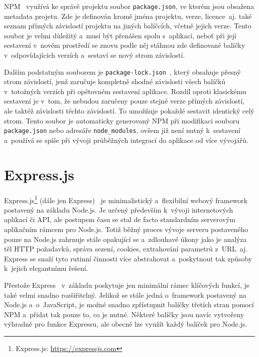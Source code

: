 NPM~\cite{thesis:WebApp} využívá ke správě projektu soubor \texttt{package.json}, ve kterém jsou obsažena metadata projetu. Zde je definován kromě jména projektu, verze, licence~aj. také seznam přímých závislostí projektu na jiných balíčcích, včetně jejich verze. Tento soubor je velmi důležitý a~musí být přenášen spolu s~aplikací, neboť při její sestavení v~novém prostředí se znovu podle něj stáhnou zde definované balíčky v~odpovídajících verzích a~sestaví se nový strom závislostí.

Dalším podstatným souborem je \texttt{package-lock.json}~\cite{thesis:WebApp}, který obsahuje přesný strom závislostí, jenž zaručuje kompletně shodné závislosti všech balíčků v~totožných verzích při opětovném sestavení aplikace. Rozdíl oproti klasickému sestavení je v~tom, že nebudou zaručeny pouze stejné verze přímých závislostí, ale taktéž závislosti těchto závislostí. To umožňuje pokaždé sestavit identický celý strom. Tento soubor je automaticky generovaný NPM při modifikaci souboru \texttt{package.json} nebo adresáře \texttt{node\_modules}, ovšem již není nutný k~sestavení a~používá se spíše při vývoji průběžných integrací do aplikace od více vývojářů.

\section{Express.js}
\label{sec:Express}
Express.js\footnote{Express.js: \url{https://expressjs.com}} (dále jen Express)~\cite{book:WebDevNodeAndExpress, book:ProExpress} je minimalistický a~flexibilní webový framework postavený na základu Node.js. Je určený především k~vývoji internetových aplikací či API, ale postupem času se stal de facto standardním serverovým aplikačním rámcem pro Node.js. Totiž běžný proces vývoje serveru postaveného pouze na Node.js zahrnuje stále opakující se a~zdlouhavé úkony jako je analýza těl HTTP požadavků, správa sezení, cookies, extrahování parametrů z~URL~aj. Express se snaží tyto rutinní činnosti více abstrahovat a~poskytnout tak způsoby k~jejich elegantnímu řešení.

Přestože Express~\cite{book:WebDevNodeAndExpress} v~základu poskytuje jen minimální rámec klíčových funkcí, je také velmi snadno rozšiřitelný. Jelikož se stále jedná o~framework postavený na Node.js a~o~JavaScript, je možné snadno zpřístupnit balíčky třetích stran pomocí NPM a~přidat tak pouze to, co je nutné. Některé balíčky jsou navíc vytvořeny výhradně pro funkce Expressu, ale obecně lze využít každý balíček pro Node.js.

